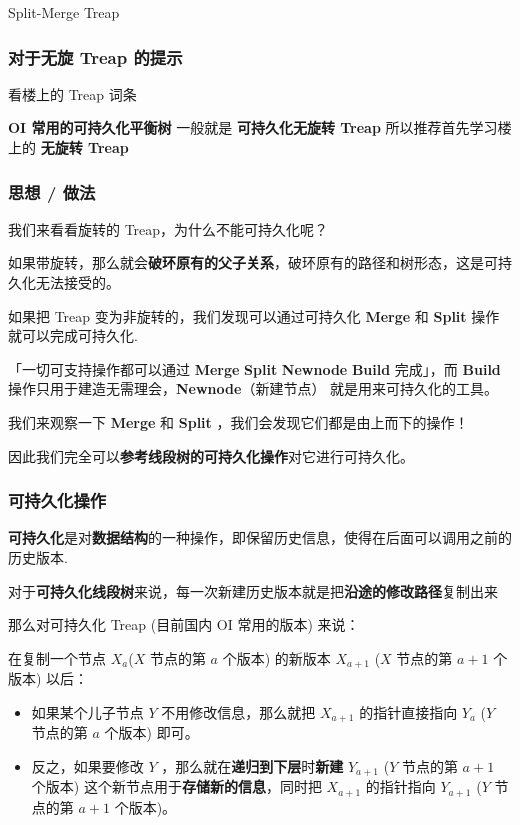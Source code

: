 
Split-Merge Treap

\hr

\subsubsection{对于无旋 Treap 的提示}

看楼上的  Treap 词条 

\textbf{OI 常用的可持久化平衡树} 一般就是 \textbf{可持久化无旋转 Treap} 所以推荐首先学习楼上的 \textbf{无旋转 Treap}

\subsubsection{思想 / 做法}

我们来看看旋转的 Treap，为什么不能可持久化呢？

如果带旋转，那么就会\textbf{破环原有的父子关系}，破环原有的路径和树形态，这是可持久化无法接受的。

如果把 Treap 变为非旋转的，我们发现可以通过可持久化 \textbf{Merge} 和 \textbf{Split} 操作就可以完成可持久化.

「一切可支持操作都可以通过 \textbf{Merge} \textbf{Split} \textbf{Newnode} \textbf{Build} 完成」，而 \textbf{Build} 操作只用于建造无需理会，\textbf{Newnode}（新建节点） 就是用来可持久化的工具。

我们来观察一下 \textbf{Merge} 和 \textbf{Split} ，我们会发现它们都是由上而下的操作！

因此我们完全可以\textbf{参考线段树的可持久化操作}对它进行可持久化。

\subsubsection{可持久化操作}

\textbf{可持久化}是对\textbf{数据结构}的一种操作，即保留历史信息，使得在后面可以调用之前的历史版本.

对于\textbf{可持久化线段树}来说，每一次新建历史版本就是把\textbf{沿途的修改路径}复制出来

那么对可持久化 Treap (目前国内 OI 常用的版本) 来说：

在复制一个节点 $X_{a}$($X$ 节点的第 $a$ 个版本) 的新版本 $X_{a+1}$ ($X$ 节点的第 $a+1$ 个版本) 以后：

\begin{itemize}
\item 如果某个儿子节点 $Y$ 不用修改信息，那么就把 $X_{a+1}$ 的指针直接指向 $Y_{a}$ ($Y$ 节点的第 $a$ 个版本) 即可。
\item 反之，如果要修改 $Y$ ，那么就在\textbf{递归到下层}时\textbf{新建} $Y_{a+1}$ ($Y$ 节点的第 $a+1$ 个版本) 这个新节点用于\textbf{存储新的信息}，同时把 $X_{a+1}$ 的指针指向 $Y_{a+1}$ ($Y$ 节点的第 $a+1$ 个版本)。
\end{itemize}

